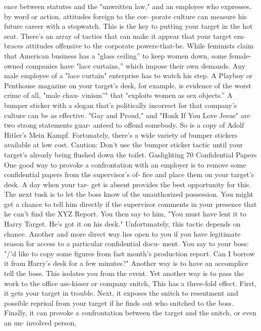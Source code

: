 \documentclass{book}
\begin{document}
ence between statutes and the "unwritten law," and an employee 
who expresses, by word or action, attitudes foreign to the cor- 
porate culture can measure his future career with a stopwatch. 
This is the key to putting your target in the hot seat. There's an 
array of tactics that can make it appear that your target em- 
braces attitudes offensive to the corporate powers-that-be. 
While feminists claim that American business has a "glass 
ceiling” to keep women down, some female-owned companies 
have "lace curtains,” which impose their own demands. Any 
male employee of a "lace curtain" enterprise has to watch his 
step. A Playboy or Penthouse magazine on your target's desk, 
for example, is evidence of the worst crime of all, "male chau- 
vinism”" that "exploits women as sex objects.” 
A bumper sticker with a slogan that's politically incorrect 
for that company's culture can be as effective. "Gay and Proud," 
and "Honk If You Love Jesus" are two strong statements guar- 
anteed to offend somebody. So is a copy of Adolf Hitler's Mein 
Kampf. Fortunately, there's a wide variety of bumper stickers 
available at low cost. Caution: Don't use the bumper sticker 
tactic until your target's already being flushed down the toilet.  
Gaslighting 
70 
Confidential Papers 
One good way to provoke a confrontation with an employer 
is to remove some confidential papers from the supervisor's of- 
fice and place them on your target's desk. A day when your tar- 
get is absent provides the best opportunity for this. 
The next tusk is to let the boss know of the unauthorized 
possession. You might get a chance to tell him directly if the 
supervisor comments in your presence that he can't find the 
XYZ Report. You then say to him, "You must have lent it to 
Harry Target. He's got it on his desk." Unfortunately, this tactic 
depends on chance. 
Another and more direct way lies open to you if you have 
legitimate reason for access to a particular confidential docu- 
ment. You say to your boss: "/'d like to copy some figures from 
fast month's production report. Can I borrow it fram Harry's 
desk for a few minutes?" 
Another way is to have an accomplice tell the boss. This 
isolates you from the event. Yet another way is to pass the work 
to the office ass-kisser or company snitch, This has a three-fold 
effect. First, it gets your target in trouble. Next, it exposes the 
snitch to resentment and possible reprisal from your target if he 
finds out who snitched to the boss. Finally, it can provoke a 
confrontation between the target and the snitch, or even an un- 
involved person, 
\end{document}
